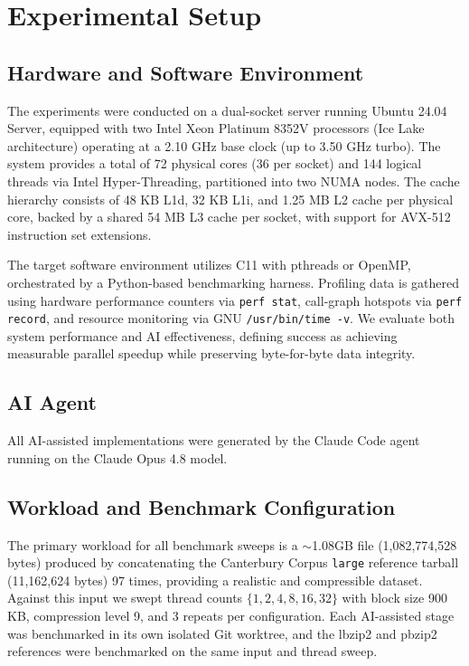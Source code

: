 \documentclass[conference]{IEEEtran}
\begin{document}
\section{Experimental Setup}

\subsection{Hardware and Software Environment}
The experiments were conducted on a dual-socket server running Ubuntu 24.04 Server, equipped with two Intel Xeon Platinum 8352V processors (Ice Lake architecture) operating at a 2.10 GHz base clock (up to 3.50 GHz turbo). The system provides a total of 72 physical cores (36 per socket) and 144 logical threads via Intel Hyper-Threading, partitioned into two NUMA nodes. The cache hierarchy consists of 48 KB L1d, 32 KB L1i, and 1.25 MB L2 cache per physical core, backed by a shared 54 MB L3 cache per socket, with support for AVX-512 instruction set extensions.

The target software environment utilizes C11 with pthreads or OpenMP, orchestrated by a Python-based benchmarking harness. Profiling data is gathered using hardware performance counters via \texttt{perf stat}, call-graph hotspots via \texttt{perf record}, and resource monitoring via GNU \texttt{/usr/bin/time -v}. We evaluate both system performance and AI effectiveness, defining success as achieving measurable parallel speedup while preserving byte-for-byte data integrity.

\subsection{AI Agent}
All AI-assisted implementations were generated by the Claude Code agent running on the Claude Opus 4.8 model.

\subsection{Workload and Benchmark Configuration}
\label{subsec:dataset}
The primary workload for all benchmark sweeps is a $\sim$1.08GB file (1,082,774,528 bytes) produced by concatenating the Canterbury Corpus \texttt{large} reference tarball (11,162,624 bytes) 97 times, providing a realistic and compressible dataset. Against this input we swept thread counts $\{1, 2, 4, 8, 16, 32\}$ with block size 900\,KB, compression level 9, and 3 repeats per configuration. Each AI-assisted stage was benchmarked in its own isolated Git worktree, and the lbzip2 and pbzip2 references were benchmarked on the same input and thread sweep.
\end{document}
